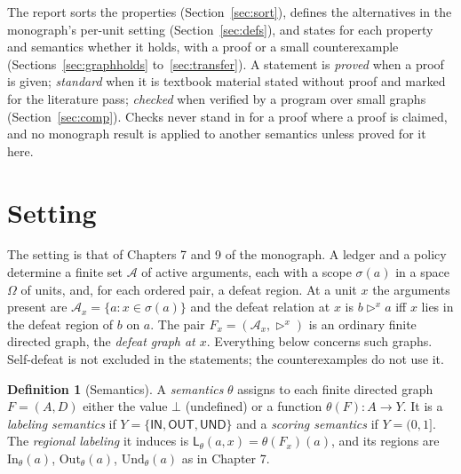 \documentclass[11pt]{article}
\theoremstyle{plain}
\theoremstyle{definition}
\newtheorem{definition}[theorem]{Definition}
\theoremstyle{remark}
\newcommand{\IN}{\textsf{IN}}
\newcommand{\OUT}{\textsf{OUT}}
\newcommand{\UND}{\textsf{UND}}
\newcommand{\dfeat}{\rhd}
\newcommand{\Lab}{\mathsf{L}}
\newcommand{\In}{\mathrm{In}}
\newcommand{\Out}{\mathrm{Out}}
\newcommand{\Und}{\mathrm{Und}}
\begin{document}
The report sorts the properties (Section~\ref{sec:sort}), defines the alternatives in the monograph's per-unit setting (Section~\ref{sec:defs}), and states for each property and semantics whether it holds, with a proof or a small counterexample (Sections~\ref{sec:graphholds} to~\ref{sec:transfer}). A statement is \emph{proved} when a proof is given; \emph{standard} when it is textbook material stated without proof and marked for the literature pass; \emph{checked} when verified by a program over small graphs (Section~\ref{sec:comp}). Checks never stand in for a proof where a proof is claimed, and no monograph result is applied to another semantics unless proved for it here.


\section{Setting}\label{sec:setting}

The setting is that of Chapters 7 and 9 of the monograph. A ledger and a policy determine a finite set $\mathcal A$ of active arguments, each with a scope $\sigma(a)$ in a space $\Omega$ of units, and, for each ordered pair, a defeat region. At a unit $x$ the arguments present are $\mathcal A_x=\{a:x\in\sigma(a)\}$ and the defeat relation at $x$ is $b\dfeat^x a$ iff $x$ lies in the defeat region of $b$ on $a$. The pair $F_x=(\mathcal A_x,\dfeat^x)$ is an ordinary finite directed graph, the \emph{defeat graph at $x$}. Everything below concerns such graphs. Self-defeat is not excluded in the statements; the counterexamples do not use it.

\begin{definition}[Semantics]\label{def:sem}
A \emph{semantics} $\theta$ assigns to each finite directed graph $F=(A,D)$ either the value $\bot$ (undefined) or a function $\theta(F):A\to Y$. It is a \emph{labeling semantics} if $Y=\{\IN,\OUT,\UND\}$ and a \emph{scoring semantics} if $Y=(0,1]$. The \emph{regional labeling} it induces is $\Lab_\theta(a,x)=\theta(F_x)(a)$, and its regions are $\In_\theta(a)$, $\Out_\theta(a)$, $\Und_\theta(a)$ as in Chapter 7.
\end{definition}
\end{document}

